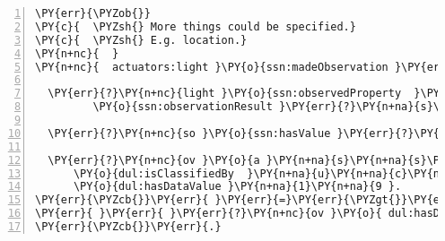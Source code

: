 \expandafter\def\csname PY@tok@err\endcsname{}
\begin{Verbatim}[commandchars=\\\{\},numbers=left,firstnumber=1,stepnumber=1]
\PY{err}{\PYZob{}}
\PY{c}{  \PYZsh{} More things could be specified.}
\PY{c}{  \PYZsh{} E.g. location.}
\PY{n+nc}{  }
\PY{n+nc}{  actuators:light }\PY{o}{ssn:madeObservation }\PY{err}{?}\PY{n+na}{l}\PY{n+na}{i}\PY{n+na}{g}\PY{n+na}{h}\PY{n+na}{t }.
  
  \PY{err}{?}\PY{n+nc}{light }\PY{o}{ssn:observedProperty  }\PY{n+na}{s}\PY{n+na}{w}\PY{n+na}{e}\PY{n+na}{e}\PY{n+na}{t}\PY{n+na}{:}\PY{n+na}{L}\PY{n+na}{i}\PY{n+na}{g}\PY{n+na}{h}\PY{n+na}{t };
         \PY{o}{ssn:observationResult }\PY{err}{?}\PY{n+na}{s}\PY{n+na}{o }.
  
  \PY{err}{?}\PY{n+nc}{so }\PY{o}{ssn:hasValue }\PY{err}{?}\PY{n+na}{o}\PY{n+na}{v }.
  
  \PY{err}{?}\PY{n+nc}{ov }\PY{o}{a }\PY{n+na}{s}\PY{n+na}{s}\PY{n+na}{n}\PY{n+na}{:}\PY{n+na}{O}\PY{n+na}{b}\PY{n+na}{s}\PY{n+na}{e}\PY{n+na}{r}\PY{n+na}{v}\PY{n+na}{a}\PY{n+na}{t}\PY{n+na}{i}\PY{n+na}{o}\PY{n+na}{n}\PY{n+na}{V}\PY{n+na}{a}\PY{n+na}{l}\PY{n+na}{u}\PY{n+na}{e };
      \PY{o}{dul:isClassifiedBy  }\PY{n+na}{u}\PY{n+na}{c}\PY{n+na}{u}\PY{n+na}{m}\PY{n+na}{:}\PY{n+na}{l}\PY{n+na}{u}\PY{n+na}{x };
      \PY{o}{dul:hasDataValue }\PY{n+na}{1}\PY{n+na}{9 }.
\PY{err}{\PYZcb{}}\PY{err}{ }\PY{err}{=}\PY{err}{\PYZgt{}}\PY{err}{ }\PY{err}{\PYZob{}}
\PY{err}{ }\PY{err}{ }\PY{err}{?}\PY{n+nc}{ov }\PY{o}{ dul:hasDataValue  }\PY{err}{?}\PY{n+na}{v}\PY{n+na}{a}\PY{n+na}{l }.
\PY{err}{\PYZcb{}}\PY{err}{.}
\end{Verbatim}
